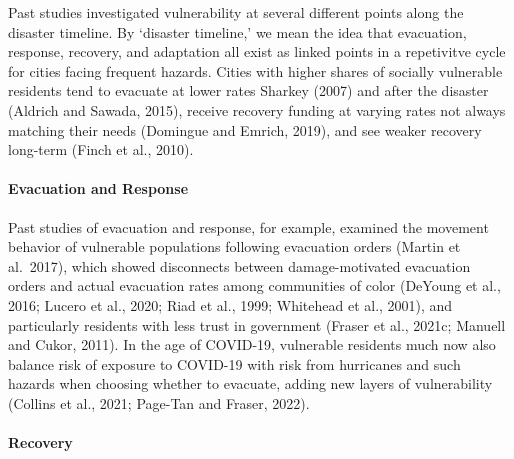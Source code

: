 \documentclass[]{elsarticle} %
\begin{document}
Past studies investigated vulnerability at several different points
along the disaster timeline. By `disaster timeline,' we mean the idea
that evacuation, response, recovery, and adaptation all exist as linked
points in a repetivitve cycle for cities facing frequent hazards. Cities
with higher shares of socially vulnerable residents tend to evacuate at
lower rates Sharkey (2007) and after the disaster (Aldrich and Sawada,
2015), receive recovery funding at varying rates not always matching
their needs (Domingue and Emrich, 2019), and see weaker recovery
long-term (Finch et al., 2010).

\hypertarget{evacuation-and-response}{%
\paragraph{Evacuation and Response}\label{evacuation-and-response}}

Past studies of evacuation and response, for example, examined the
movement behavior of vulnerable populations following evacuation orders
(Martin et al.~2017), which showed disconnects between damage-motivated
evacuation orders and actual evacuation rates among communities of color
(DeYoung et al., 2016; Lucero et al., 2020; Riad et al., 1999; Whitehead
et al., 2001), and particularly residents with less trust in government
(Fraser et al., 2021c; Manuell and Cukor, 2011). In the age of COVID-19,
vulnerable residents much now also balance risk of exposure to COVID-19
with risk from hurricanes and such hazards when choosing whether to
evacuate, adding new layers of vulnerability (Collins et al., 2021;
Page-Tan and Fraser, 2022).

\hypertarget{recovery}{%
\paragraph{Recovery}\label{recovery}}
\end{document}
